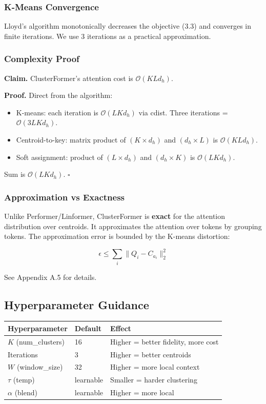 \subsubsection{K-Means Convergence}

Lloyd's algorithm monotonically decreases the objective (3.3) and converges 
in finite iterations. We use 3 iterations as a practical approximation.

\subsubsection{Complexity Proof}

\textbf{Claim.} ClusterFormer's attention cost is $\mathcal{O}(K L d_h)$.

\textbf{Proof.} Direct from the algorithm:

\begin{itemize}
\item K-means: each iteration is $\mathcal{O}(L K d_h)$ via cdist. Three
  iterations = $\mathcal{O}(3 L K d_h)$.
\item Centroid-to-key: matrix product of $(K \times d_h)$ and $(d_h \times L)$
  is $\mathcal{O}(K L d_h)$.
\item Soft assignment: product of $(L \times d_h)$ and $(d_h \times K)$ is
  $\mathcal{O}(L K d_h)$.

\end{itemize}
Sum is $\mathcal{O}(L K d_h)$. $\square$

\subsubsection{Approximation vs Exactness}

Unlike Performer/Linformer, ClusterFormer is \textbf{exact} for the attention 
distribution over centroids. It approximates the attention over tokens by 
grouping tokens. The approximation error is bounded by the K-means 
distortion:

\[
\epsilon \leq \sum_i \|Q_i - C_{a_i}\|_2^2
\]

See Appendix A.5 for details.

\subsection{Hyperparameter Guidance}

\begin{table}[H]
\centering
\small
\begin{tabular}{lll}
\toprule
\textbf{Hyperparameter} & \textbf{Default} & \textbf{Effect} \\
\midrule
$K$ (num\_clusters) & 16 & Higher = better fidelity, more cost \\
Iterations & 3 & Higher = better centroids \\
$W$ (window\_size) & 32 & Higher = more local context \\
$\tau$ (temp) & learnable & Smaller = harder clustering \\
$\alpha$ (blend) & learnable & Higher = more local \\
\bottomrule
\end{tabular}
\end{table}

